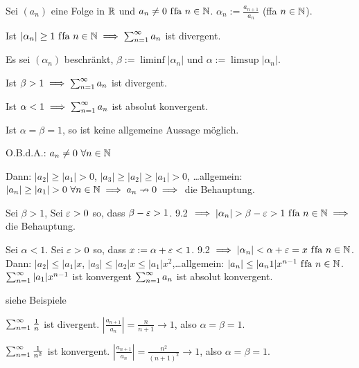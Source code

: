 \documentclass[a4paper,oneside,DIV15,BCOR12mm]{scrbook}
\begin{document}
\begin{satz}[Quotientenkriterium]

Sei $(a_n)$ eine Folge in $\mathbb{R}$ und $a_n \ne 0 \text{ f\/fa } n\in\mathbb{N}$. $\alpha_n := \frac{a_{n+1}}{a_n}$ (ffa $n\in\mathbb{N}$).
\begin{liste}
\item Ist $|\alpha_n| \ge 1 \text{ f\/fa }n\in\mathbb{N} \implies \sum_{n=1}^{\infty}{a_n}$ ist divergent.
\item Es sei $(\alpha_n)$ beschränkt, $\beta := \liminf |\alpha_n|$ und $\alpha := \limsup |\alpha_n|$.
\begin{liste}
\item Ist $\beta > 1 \implies \sum_{n=1}^{\infty}{a_n}$ ist divergent.
\item Ist $\alpha < 1 \implies \sum_{n=1}^{\infty}{a_n}$ ist absolut konvergent.
\item Ist $\alpha = \beta = 1$, so ist keine allgemeine Aussage möglich.
\end{liste}
\end{liste}
\end{satz}

\begin{beweis}
O.B.d.A.: $a_n \ne 0 \ \forall\natn$
\begin{liste}
\item Dann: $|a_2|\ge |a_1|>0$, $|a_3|\ge|a_2|\ge|a_1|>0$, \ldots allgemein: $|a_n|\ge|a_1|>0\ \forall\natn \folgt a_n\nrightarrow 0 \folgt$ die Behauptung.
\item 
\begin{liste}
\item Sei $\beta >1$, Sei $\varepsilon>0$ so, dass $\beta-\varepsilon>1$. 9.2 $\folgt |\alpha_n|>\beta-\ep>1 \ffa n\in\MdN \folgt$ die Behauptung.
\item Sei $\alpha < 1$. Sei $\varepsilon>0$ so, dass $x:=\alpha+\varepsilon<1$. 9.2 $\implies |\alpha_n|<\alpha+\varepsilon=x \text{ f\/fa }n\in\mathbb{N}$. Dann: $|a_2|\le|a_1|x$, $|a_3|\le|a_2|x\le|a_1|x^2$,\ldots allgemein: $|a_n|\le|a_n1|x^{n-1} \text{ f\/fa }n\in\mathbb{N}$. $\sum_{n=1}^{\infty}{|a_1|x^{n-1}}$ ist konvergent  $\sum_{n=1}^{\infty}{a_n}$ ist absolut konvergent.
\item siehe Beispiele
\end{liste}
\end{liste}
\end{beweis}

\begin{beispiele}
\item $\sum_{n=1}^{\infty}{\frac{1}{n}}$ ist divergent. $\left|\frac{a_{n+1}}{a_n}\right| = \frac{n}{n+1} \to 1$, also $\alpha = \beta = 1$.
\item $\sum_{n=1}^{\infty}{\frac{1}{n^2}}$ ist konvergent. $\left|\frac{a_{n+1}}{a_n}\right| = \frac{n^2}{(n+1)^2} \to 1$, also $\alpha = \beta = 1$.
\end{beispiele}
\end{document}
